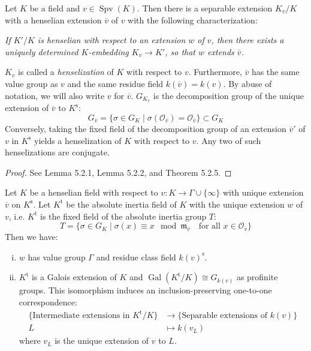 \begin{theorem}\label{theorem-henselization}
Let $K$ be a field and $v\in\operatorname{Spv}(K)$. Then there is a separable extension $K_v/K$ with a henselian extension $\overline{v}$ of $v$ with the following characterization:

\textit{If $K'/K$ is henselian with respect to an extension $w$ of $v$, then there exists a uniquely determined $K$-embedding $K_v\to K'$, so that $w$ extends $\overline{v}$.}

$K_v$ is called a \textit{henselization} of $K$ with respect to $v$. Furthermore, $\overline{v}$ has the same value group as $v$ and the same residue field $k(\overline{v}) = k(v)$. By abuse of notation, we will also write $v$ for $\overline{v}$. $G_{K_v}$ is the decomposition group of the unique extension of $\overline{v}$ to $K^\text{s}$:
\[ G_{\overline{v}} = \{ \sigma\in G_K\mid \sigma(\mathcal{O}_{\overline{v}}) =\mathcal{O}_{\overline{v}} \} \subset G_K \]
Conversely, taking the fixed field of the decomposition group of an extension $\overline{v}'$ of $v$ in $K^\text{s}$ yields a henselization of $K$ with respect to $v$. Any two of such henselizations are conjugate.
\end{theorem}

\begin{proof}
See \cite{EP05} Lemma 5.2.1, Lemma 5.2.2, and Theorem 5.2.5.
\end{proof}

\begin{theorem}\label{theorem-absoluteinertia}
Let $K$ be a henselian field with respect to $v: K\to\Gamma\cup\{\infty\}$ with unique extension $\overline{v}$ on $K^\text{s}$. Let $K^\text{t}$ be the absolute inertia field of $K$ with the unique extension $w$ of $v$, i.e. $K^\text{t}$ is the fixed field of the absolute inertia group $T$: 
\[ T = \{ \sigma\in G_K\mid \sigma(x)\equiv x\mod \mathfrak{m}_{\overline{v}} \quad \text{for all }x\in\mathcal{O}_{\overline{v}} \}\]
Then we have:
\begin{enumerate}[(i)]
\item $w$ has value group $\Gamma$ and residue class field $k(v)^\text{s}$.
\item $K^\text{t}$ is a Galois extension of $K$ and $\operatorname{Gal}(K^\text{t}/K)\cong G_{k(v)}$ as profinite groups. This isomorphism induces an inclusion-preserving one-to-one correspondence: 
\begin{align*}
\{ \text{Intermediate extensions in $K^\text{t}/K$} \} &\longrightarrow \{\text{Separable extensions of $k(v)$} \}\\ 
L &\longmapsto k(v_L)  
\end{align*}
where $v_L$ is the unique extension of $v$ to $L$.
\end{enumerate}
\end{theorem}

